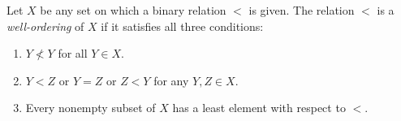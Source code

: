 Let $X$ be any set on which a binary relation $<$ is given. The relation $<$ is a \textit{well-ordering} of $X$ if it satisfies all three conditions:

\begin{enumerate}
\item[(a)] $Y \not< Y$ for all $Y \in X$.
\item[(b)] $Y < Z$ or $Y = Z$ or $Z < Y$ for any $Y, Z \in X$.
\item[(c)] Every nonempty subset of $X$ has a least element with respect to $<$.
\end{enumerate}
